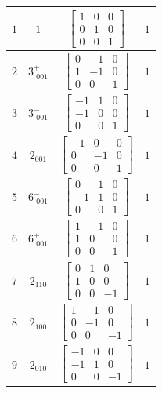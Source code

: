 \documentclass[fleqn,8pt]{jsarticle}
\begin{document}
\begin{longtable}{cccc}
$ 1 $ & $ 1 $ & $ \begin{bmatrix} 1 & 0 & 0 \\ 0 & 1 & 0 \\ 0 & 0 & 1 \end{bmatrix} $ & $ 1 $ \\ \hline
$ 2 $ & $ 3^{+}_{\,\,001} $ & $ \begin{bmatrix} 0 & -1 & 0 \\ 1 & -1 & 0 \\ 0 & 0 & 1 \end{bmatrix} $ & $ 1 $ \\ \hline
$ 3 $ & $ 3^{-}_{\,\,001} $ & $ \begin{bmatrix} -1 & 1 & 0 \\ -1 & 0 & 0 \\ 0 & 0 & 1 \end{bmatrix} $ & $ 1 $ \\ \hline
$ 4 $ & $ 2{}_{001} $ & $ \begin{bmatrix} -1 & 0 & 0 \\ 0 & -1 & 0 \\ 0 & 0 & 1 \end{bmatrix} $ & $ 1 $ \\ \hline
$ 5 $ & $ 6^{-}_{\,\,001} $ & $ \begin{bmatrix} 0 & 1 & 0 \\ -1 & 1 & 0 \\ 0 & 0 & 1 \end{bmatrix} $ & $ 1 $ \\ \hline
$ 6 $ & $ 6^{+}_{\,\,001} $ & $ \begin{bmatrix} 1 & -1 & 0 \\ 1 & 0 & 0 \\ 0 & 0 & 1 \end{bmatrix} $ & $ 1 $ \\ \hline
$ 7 $ & $ 2{}_{110} $ & $ \begin{bmatrix} 0 & 1 & 0 \\ 1 & 0 & 0 \\ 0 & 0 & -1 \end{bmatrix} $ & $ 1 $ \\ \hline
$ 8 $ & $ 2{}_{100} $ & $ \begin{bmatrix} 1 & -1 & 0 \\ 0 & -1 & 0 \\ 0 & 0 & -1 \end{bmatrix} $ & $ 1 $ \\ \hline
$ 9 $ & $ 2{}_{010} $ & $ \begin{bmatrix} -1 & 0 & 0 \\ -1 & 1 & 0 \\ 0 & 0 & -1 \end{bmatrix} $ & $ 1 $ \\ \hline

\end{longtable}
\end{document}
